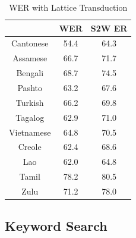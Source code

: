 \documentclass[journal]{IEEEtran}
\begin{document}
\begin{table}[!t]
  \caption{WER with Lattice Transduction}
  \label{tab:WER}
  \centering
  \begin{tabular}{|c|c|c|}
    \hline
              & WER     & S2W ER \\
    \hline
    Cantonese & 54.4    & 64.3 \\
    Assamese  & 66.7    & 71.7 \\
    Bengali   & 68.7    & 74.5 \\
    Pashto    & 63.2    & 67.6 \\
    Turkish   & 66.2    & 69.8 \\
    Tagalog   & 62.9    & 71.0 \\
    Vietnamese & 64.8   & 70.5 \\
    Creole    & 62.4    & 68.6 \\
    Lao       & 62.0    & 64.8 \\
    Tamil     & 78.2    & 80.5 \\
    Zulu      & 71.2    & 78.0 \\
    \hline
  \end{tabular}
\end{table}

\subsection{Keyword Search}
\end{document}
